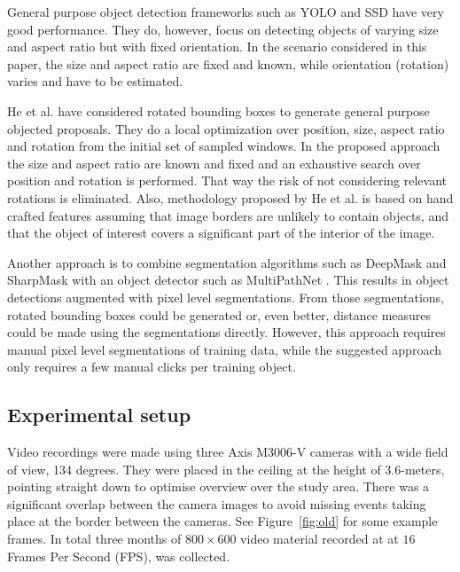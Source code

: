\documentclass{cta-author}
\begin{document}
General purpose object detection frameworks such as YOLO
\cite{Redmon_2016_CVPR,redmon2016yolo9000} and SSD \cite{liu2016ssd} have very good
performance. They do, however, focus on detecting objects of varying size and aspect ratio but with fixed
orientation. In the scenario considered in this paper, the size and aspect ratio are fixed and known, while
orientation (rotation) varies and have to be estimated.

He et al. \cite{He_2015_ICCV} have considered rotated bounding boxes to generate general purpose objected
proposals. They do a local optimization over position, size, aspect ratio and rotation from the initial set of
sampled windows. In the proposed approach the size and aspect ratio are known and fixed and an exhaustive
search over position and rotation is performed. That way the risk of not considering relevant rotations is
eliminated. Also, methodology proposed by He et al. \cite{He_2015_ICCV}  is based on hand crafted features
assuming that image borders are unlikely to contain objects, and that the object of interest covers a
significant part of the interior of the image.

Another approach is to combine segmentation algorithms such as
DeepMask \cite{DBLP:journals/corr/PinheiroCD15} and
SharpMask \cite{DBLP:journals/corr/PinheiroLCD16} with an object detector such as
MultiPathNet \cite{DBLP:journals/corr/ZagoruykoLLPGCD16}. This results in object detections augmented with
pixel level segmentations. From those segmentations, rotated bounding boxes could be generated or, even
better, distance measures could be made using the segmentations directly. However, this approach requires
manual pixel level segmentations of training data, while the suggested approach only requires a few manual
clicks per training object.

\subsection{Experimental setup}


Video recordings were made using three Axis M3006-V cameras with a wide field of view, 134 degrees. They were
placed in the ceiling at the height of $3.6$-meters, pointing straight down to optimise overview over the
study area. There was a significant overlap between the camera images to avoid missing events taking place at the
border between the cameras. See Figure~\ref{fig:old} for some example frames. In total three months of $800
\times 600$ video material recorded at at $16$ Frames Per Second (FPS), was collected.
\end{document}
